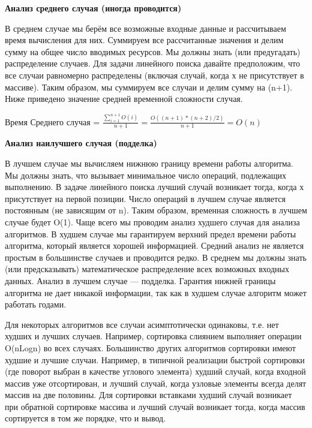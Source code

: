 \vspace{\baselineskip}
\textbf{Анализ среднего случая (иногда проводится)}

\vspace{\baselineskip}
В среднем случае мы берём все возможные входные данные и рассчитываем время вычисления для них. Суммируем все рассчитанные значения и делим сумму на общее число вводимых ресурсов. Мы должны знать (или предугадать) распределение случаев. Для задачи линейного поиска давайте предположим, что все случаи равномерно распределены (включая случай, когда х не присутствует в массиве). Таким образом, мы суммируем все случаи и делим сумму на (n+1). Ниже приведено значение средней временной сложности случая.

\vspace{\baselineskip}
\begin{tcolorbox}

Время Среднего случая = $\frac{\sum^{n+1}_{i=1} O(i)}{n+1}=\frac{O((n+1)*(n+2)/2)}{n+1}=O(n)$

\end{tcolorbox}

\vspace{\baselineskip}
\textbf{Анализ наилучшего случая (подделка)}

\vspace{\baselineskip}
В лучшем случае мы вычисляем нижнюю границу времени работы алгоритма. Мы должны знать, что вызывает минимальное число операций, подлежащих выполнению. В задаче линейного поиска лучший случай возникает тогда, когда х присутствует на первой позиции. Число операций в лучшем случае является постоянным (не зависящим от n). Таким образом, временная сложность в лучшем случае будет O(1). Чаще всего мы проводим анализ худшего случая для анализа алгоритмов. В худшем случае мы гарантируем верхний предел времени работы алгоритма, который является хорошей информацией. Средний анализ не является простым в большинстве случаев и проводится редко. В среднем мы должны знать (или предсказывать) математическое распределение всех возможных входных данных. Анализ в лучшем случае --- подделка. Гарантия нижней границы алгоритма не дает никакой информации, так как в худшем случае алгоритм может работать годами.

\vspace{\baselineskip}
Для некоторых алгоритмов все случаи асимптотически одинаковы, т.е. нет худших и лучших случаев. Например, сортировка слиянием выполняет операции O(nLogn) во всех случаях. Большинство других алгоритмов сортировки имеют худшие и лучшие случаи. Например, в типичной реализации быстрой сортировки (где поворот выбран в качестве углового элемента) худший случай, когда входной массив уже отсортирован, и лучший случай, когда узловые элементы всегда делят массив на две половины. Для сортировки вставками худший случай возникает при обратной сортировке массива и лучший случай возникает тогда,
когда массив сортируется в том же порядке, что и вывод.

